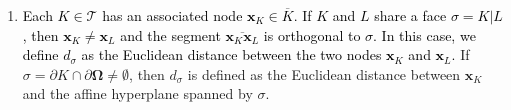 \documentclass[10pt,a4paper, final]{article}
\newcommand{\reviewerOne}[1]{\textcolor{black}{#1}}
\theoremstyle{definition}								%
\numberwithin{equation}{section}
\numberwithin{figure}{section}
\numberwithin{theorem}{section}
\begin{document}
{\begin{enumerate}
        \item \reviewerOne{Each $K \in \mathcal{T}$ has an associated node $\mathbf{x}_K \in \overline{K}$.
        If $K$ and  $L$ share a face $\sigma =K | L$, then $\mathbf{x}_K \neq \mathbf{x}_L $ and the segment $\overline{\mathbf{x}_K \mathbf{x}_L}$ is orthogonal to $\sigma$.
        In this case, we define $d_\sigma$ as the Euclidean distance between the two nodes $\mathbf{x}_K$ and $\mathbf{x}_L$.}
        If $\sigma = \partial K \cap \partial \mathbf{\Omega} \neq \emptyset$, then $d_\sigma$ is defined as the Euclidean distance between $\mathbf{x}_K$ and the affine hyperplane spanned by $\sigma$.
\end{enumerate}
}
\end{document}
